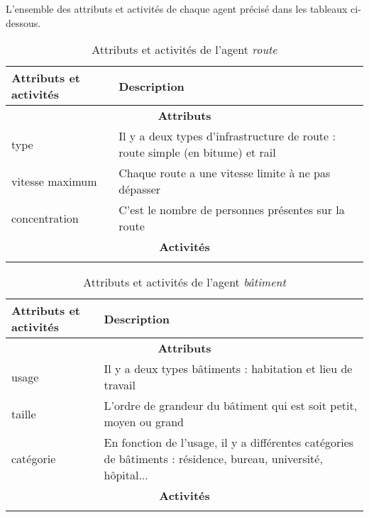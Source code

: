 L'ensemble des attributs et activités de chaque agent précisé dans les tableaux ci-dessous.

\begin{table}[!ht]
\begin{center}
\caption{Attributs et activités de l'agent \textit{route}\label{tab:rouge}}
\begin{tabular}{|p{5cm}|p{10cm}|}
\hline \bf Attributs et activités &  \bf Description\\
\hline
\multicolumn{2}{|c|}{\bf Attributs}
\\
\hline
 type & Il y a deux types d'infrastructure de route : route simple (en bitume) et rail
 \\
 \hline
 vitesse maximum & Chaque route a une vitesse limite à ne pas dépasser
  \\ 
 \hline
 concentration  & C'est le nombre de personnes présentes sur la route
 \\
\hline
 \multicolumn{2}{|c|}{\bf Activités}
 \\
 \hline
& 
 \\
\hline
\end{tabular}
\end{center}
\end{table}

\begin{table}[!ht]
\begin{center}
\caption{Attributs et activités de l'agent \textit{bâtiment}\label{tab:batiment}}
\begin{tabular}{|p{5cm}|p{10cm}|}
\hline \bf Attributs et activités &  \bf Description\\
\hline
\multicolumn{2}{|c|}{\bf Attributs}
\\
\hline
 usage & Il y a deux types bâtiments : habitation et lieu de travail
 \\
 \hline
 taille & L'ordre de grandeur du bâtiment qui est soit petit, moyen ou grand
  \\ 
 \hline
 catégorie  & En fonction de l'usage, il y a différentes catégories de bâtiments : résidence, bureau, université, hôpital...
 \\
\hline
 \multicolumn{2}{|c|}{\bf Activités}
 \\
 \hline
& 
 \\
\hline
\end{tabular}
\end{center}
\end{table}


